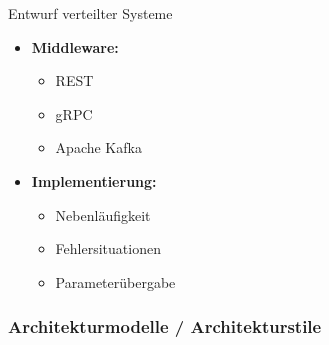 \begin{KR}{Entwurf verteilter Systeme}
    \begin{minipage}[t]{0.5\textwidth}
        \begin{itemize}
            \item \textbf{Middleware:}
        \begin{itemize}
            \item REST
            \item gRPC
            \item Apache Kafka
        \end{itemize}
    \end{itemize}
    \end{minipage}
    \begin{minipage}[t]{0.5\textwidth}
        \begin{itemize}
            \item \textbf{Implementierung:}
        \begin{itemize}
            \item Nebenläufigkeit
            \item Fehlersituationen
            \item Parameterübergabe
        \end{itemize}
    \end{itemize}
    \end{minipage}
\end{KR}


\subsubsection{Architekturmodelle / Architekturstile}

